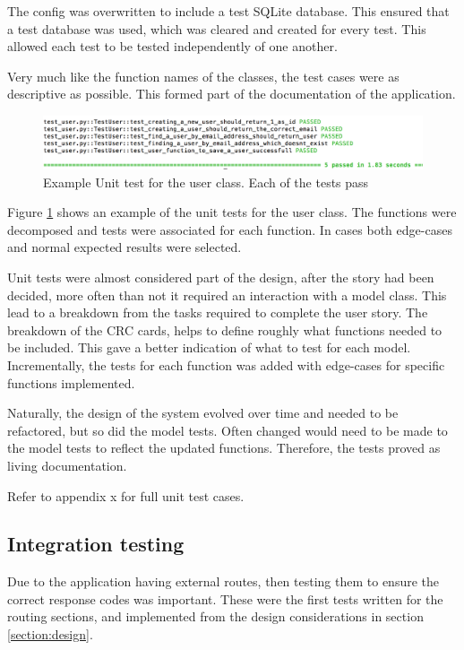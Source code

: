 The config was overwritten to include a test SQLite database. This ensured that a test database was used, which was cleared and created for every test. This allowed each test to be tested independently of one another.

Very much like the function names of the classes, the test cases were as descriptive as possible. This formed part of the documentation of the application.

\begin{figure}[h!]
  \centering
  \includegraphics[width=\textwidth]{images/unit_test_user}
  \caption{Example Unit test for the user class. Each of the tests pass}
  \label{fig:unit_user}
\end{figure}

Figure \ref{fig:unit_user} shows an example of the unit tests for the user class. The functions were decomposed and tests were associated for each function. In cases both edge-cases and normal expected results were selected.

Unit tests were almost considered part of the design, after the story had been decided, more often than not it required an interaction with a model class. This lead to a breakdown from the tasks required to complete the user story. The breakdown of the CRC cards, helps to define roughly what functions needed to be included. This gave a better indication of what to test for each model. Incrementally, the tests for each function was added with edge-cases for specific functions implemented.

Naturally, the design of the system evolved over time and needed to be refactored, but so did the model tests. Often changed would need to be made to the model tests to reflect the updated functions. Therefore, the tests proved as living documentation.

Refer to appendix x for full unit test cases.

\subsection{Integration testing}
Due to the application having external routes, then testing them to ensure the correct response codes was important. These were the first tests written for the routing sections, and implemented from the design considerations in section \ref{section:design}.

